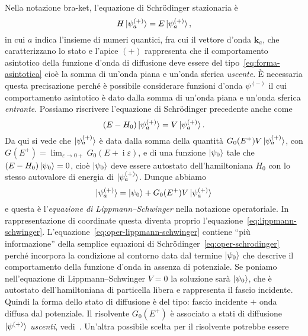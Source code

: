 \documentclass[a4paper,fleqn,twoside,12pt]{article}
\renewcommand{\epsilon}{\varepsilon}
\DeclareMathOperator{\uimm}{\mathrm{i}} %
\begin{document}
Nella notazione bra-ket, l'equazione di Schrödinger stazionaria è
\begin{equation}
  H \ket{\psi_{a}^{(+)}} = E \ket{\psi_{a}^{(+)}},
\end{equation}
in cui $a$ indica l'insieme di numeri quantici, fra cui il vettore d'onda
$\bm{k}_{a}$, che caratterizzano lo stato e l'apice $(+)$ rappresenta che il
comportamento asintotico della funzione d'onda di diffusione deve essere del
tipo~\eqref{eq:forma-asintotica} cioè la somma di un'onda piana e un'onda
sferica \emph{uscente}.  È necessaria questa precisazione perché è possibile
considerare funzioni d'onda $\psi^{(-)}$ il cui comportamento asintotico è dato
dalla somma di un'onda piana e un'onda sferica \emph{entrante}.  Possiamo
riscrivere l'equazione di Schrödinger precedente anche come
\begin{equation}
  \label{eq:oper-schrodinger}
  (E - H_{0})\ket{\psi_{a}^{(+)}} = V \ket{\psi_{a}^{(+)}}.
\end{equation}
Da qui si vede che $\ket{\psi_{a}^{(+)}}$ è data dalla somma della quantità
$G_{0}(E^{+})V\ket{\psi_{a}^{(+)}}$, con
$G_{}(E^{+})
= \lim_{\epsilon \to 0+} G_{0}(E + \uimm \epsilon)$,
e di una funzione $\ket{\psi_{0}}$ tale che $(E - H_{0})\ket{\psi_{0}} = 0$,
cioè $\ket{\psi_{0}}$ deve essere autostato dell'hamiltoniana $H_{0}$ con lo
stesso autovalore di energia di $\ket{\psi_{a}^{(+)}}$.  Dunque abbiamo
\begin{equation}
  \label{eq:oper-lippmann-schwinger}
  \ket{\psi_{a}^{(+)}} = \ket{\psi_{0}} + G_{0}(E^{+})V\ket{\psi_{a}^{(+)}}
\end{equation}
e questa è l'\emph{equazione di Lippmann–Schwinger} nella notazione
operatoriale.  In rappresentazione di coordinate questa diventa proprio
l'equazione~\eqref{eq:lippmann-schwinger}.
L'equazione~\eqref{eq:oper-lippmann-schwinger} contiene ``più informazione''
della semplice equazioni di Schrödinger~\eqref{eq:oper-schrodinger} perché
incorpora la condizione al contorno data dal termine $\ket{\psi_{0}}$ che
descrive il comportamento della funzione d'onda in assenza di potenziale.  Se
poniamo nell'equazione di Lippmann–Schwinger $V = 0$ la soluzione sarà
$\ket{\psi_{0}}$, che è autostato dell'hamiltoniana di particella libera e
rappresenta il fascio incidente.  Quindi la forma dello stato di diffusione è
del tipo: fascio incidente $+$ onda diffusa dal potenziale.  Il risolvente
$G_{0}(E^{+})$ è associato a stati di diffusione $\ket{\psi^{(+)}}$
\emph{uscenti}, vedi~\textcite[450-452]{ballentine:quantum-mechanics}.  Un'altra
possibile scelta per il risolvente potrebbe essere
\end{document}
